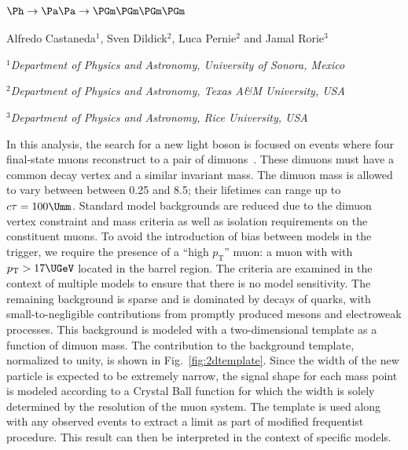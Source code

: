 \subsubsection{\texorpdfstring{$\Ph\to\Pa\Pa\to\PGm\PGm\PGm\PGm$}{Higgs to two a to mu mu mu mu }}
\label{subsec:fourmu}

\begin{center}
 {Alfredo Castaneda$^{1}$, Sven Dildick$^{2}$, Luca Pernie$^{2}$ and Jamal Rorie$^{3}$ \\
}
\centerline{{\it  $^{1}$Department of Physics and Astronomy, University of Sonora, Mexico}}
\centerline{{\it $^{2}$Department of Physics and Astronomy, Texas A\&M University, USA}}
\centerline{{\it  $^{3}$Department of Physics and Astronomy, Rice University, USA}}
\end{center}

In this analysis, the search for a new light boson is focused on events where four final-state muons reconstruct to a pair of dimuons~\cite{CMS-PAS-HIG-18-003}. These dimuons must have a common decay vertex and a similar invariant mass. The dimuon mass is allowed to vary between between 0.25 and 8.5\UGeV; their lifetimes can range up to $c\tau=100\Umm$. Standard model backgrounds are reduced due to the dimuon vertex constraint and mass criteria as well as isolation requirements on the constituent muons. To avoid the introduction of bias between models in the trigger, we require the presence of a ``high $p_\mathrm{T}$'' muon: a muon with with $p_\mathrm{T} > 17\UGeV$ located in the barrel region. The criteria are examined in the context of multiple models to ensure that there is no model sensitivity. The remaining background is sparse and is dominated by decays of \PQb\PAQb quarks, with small-to-negligible contributions from promptly produced \PJGy mesons and electroweak processes. This background is modeled with a two-dimensional template as a function of dimuon mass. The \PQb\PAQb contribution to the background template, normalized to unity, is shown in Fig.~\ref{fig:2dtemplate}. Since the width of the new particle is expected to be extremely narrow, the signal shape for each mass point is modeled according to a Crystal Ball \cite{Oreglia:1980cs} function for which the width is solely determined by the resolution of the muon system. The template is used along with any observed events to extract a limit as part of modified frequentist procedure. This result can then be interpreted in the context of specific models.

